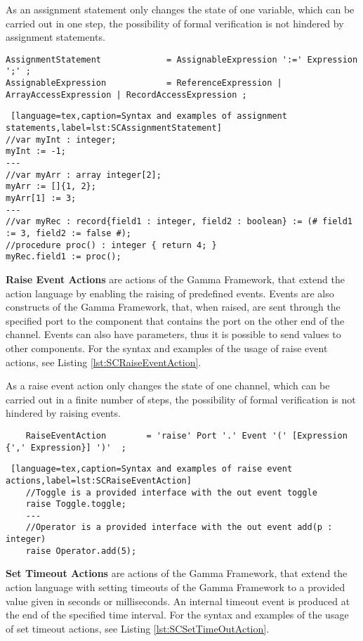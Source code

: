 As an assignment statement only changes the state of one variable, which can be carried out in one step, the possibility of formal verification is not hindered by assignment statements.
\bigskip
\begin{lstlisting}
AssignmentStatement 			= AssignableExpression ':=' Expression ';' ;
AssignableExpression 			= ReferenceExpression | ArrayAccessExpression | RecordAccessExpression ;
\end{lstlisting}
\begin{lstlisting} [language=tex,caption=Syntax and examples of assignment statements,label=lst:SCAssignmentStatement]
//var myInt : integer;
myInt := -1;
---
//var myArr : array integer[2];
myArr := []{1, 2};
myArr[1] := 3;
---
//var myRec : record{field1 : integer, field2 : boolean} := (# field1 := 3, field2 := false #);
//procedure proc() : integer { return 4; }
myRec.field1 := proc();
\end{lstlisting}

\bigskip
\textbf{Raise Event Actions} are actions of the Gamma Framework, that extend the action language by enabling the raising of predefined events. Events are also constructs of the Gamma Framework, that, when raised, are sent through the specified port to the component that contains the port on the other end of the channel. Events can also have parameters, thus it is possible to send values to other components. For the syntax and examples of the usage of raise event actions, see Listing \ref{lst:SCRaiseEventAction}.

As a raise event action only changes the state of one channel, which can be carried out in a finite number of steps, the possibility of formal verification is not hindered by raising events.
\bigskip
\begin{lstlisting}
	RaiseEventAction 		= 'raise' Port '.' Event '(' [Expression {',' Expression}] ')'  ;	
\end{lstlisting}
\begin{lstlisting} [language=tex,caption=Syntax and examples of raise event actions,label=lst:SCRaiseEventAction]
	//Toggle is a provided interface with the out event toggle
	raise Toggle.toggle;
	---
	//Operator is a provided interface with the out event add(p : integer)
	raise Operator.add(5);
\end{lstlisting}

\textbf{Set Timeout Actions} are actions of the Gamma Framework, that extend the action language with setting timeouts of the Gamma Framework to a provided value given in seconds or milliseconds. An internal timeout event is produced at the end of the specified time interval. For the syntax and examples of the usage of set timeout actions, see Listing \ref{lst:SCSetTimeOutAction}.

